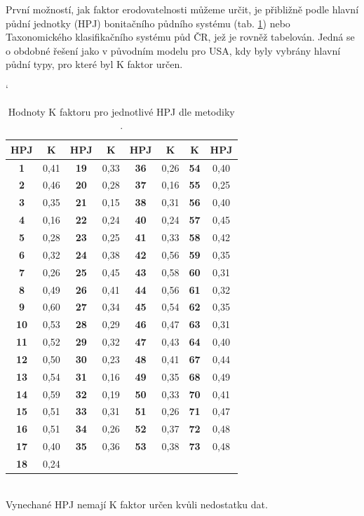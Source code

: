 První možností, jak faktor erodovatelnosti můžeme určit, je přibližně
podle hlavní půdní jednotky (HPJ) bonitačního půdního systému
(tab. \ref{hpj_k}) nebo Taxonomického klasifikačního systému půd
ČR\cite{Nemecek2001}, jež je rovněž tabelován\cite{janecek2012}. Jedná
se o obdobné řešení jako v původním modelu pro USA, kdy byly vybrány
hlavní půdní typy, pro které byl K faktor určen.\cite{usle1978}

\begin{table}[hbt]
\begin{center}
\catcode`
    \noindent\begin{tabular}{|*{8}{c|}} \hline \bf HPJ & \bf K & \bf
    HPJ & \bf K & \bf HPJ & \bf K& \bf K & \bf HPJ\\ \hline \bf 1
    &0,41 &\bf 19&0,33 &\bf 36&0,26 &\bf 54&0,40 \\ \hline \bf 2 &0,46
    &\bf 20&0,28 &\bf 37&0,16 &\bf 55&0,25 \\ \hline \bf 3 &0,35 &\bf
    21&0,15 &\bf 38&0,31 &\bf 56&0,40 \\ \hline \bf 4 &0,16 &\bf
    22&0,24 &\bf 40&0,24 &\bf 57&0,45 \\ \hline \bf 5 &0,28 &\bf
    23&0,25 &\bf 41&0,33 &\bf 58&0,42 \\ \hline \bf 6 &0,32 &\bf
    24&0,38 &\bf 42&0,56 &\bf 59&0,35 \\ \hline \bf 7 &0,26 &\bf
    25&0,45 &\bf 43&0,58 &\bf 60&0,31 \\ \hline \bf 8 &0,49 &\bf
    26&0,41 &\bf 44&0,56 &\bf 61&0,32 \\ \hline \bf 9 &0,60 &\bf
    27&0,34 &\bf 45&0,54 &\bf 62&0,35 \\ \hline \bf 10&0,53 &\bf
    28&0,29 &\bf 46&0,47 &\bf 63&0,31 \\ \hline \bf 11&0,52 &\bf
    29&0,32 &\bf 47&0,43 &\bf 64&0,40 \\ \hline \bf 12&0,50 &\bf
    30&0,23 &\bf 48&0,41 &\bf 67&0,44 \\ \hline \bf 13&0,54 &\bf
    31&0,16 &\bf 49&0,35 &\bf 68&0,49 \\ \hline \bf 14&0,59 &\bf
    32&0,19 &\bf 50&0,33 &\bf 70&0,41 \\ \hline \bf 15&0,51 &\bf
    33&0,31 &\bf 51&0,26 &\bf 71&0,47 \\ \hline \bf 16&0,51 &\bf
    34&0,26 &\bf 52&0,37 &\bf 72&0,48 \\ \hline \bf 17&0,40 &\bf
    35&0,36 &\bf 53&0,38 &\bf 73&0,48 \\ \hline \bf 18&0,24 & & & & &
    & \\ \hline
    \end{tabular}\\
    \vspace{10px} Vynechané HPJ nemají K faktor určen kvůli nedostatku
    dat.
  \caption[Hodnoty K faktoru pro jednotlivé HPJ]{Hodnoty K faktoru pro
    jednotlivé HPJ dle metodiky \cite{janecek2012}.}
  \label{hpj_k}
\end{center}
\end{table}

